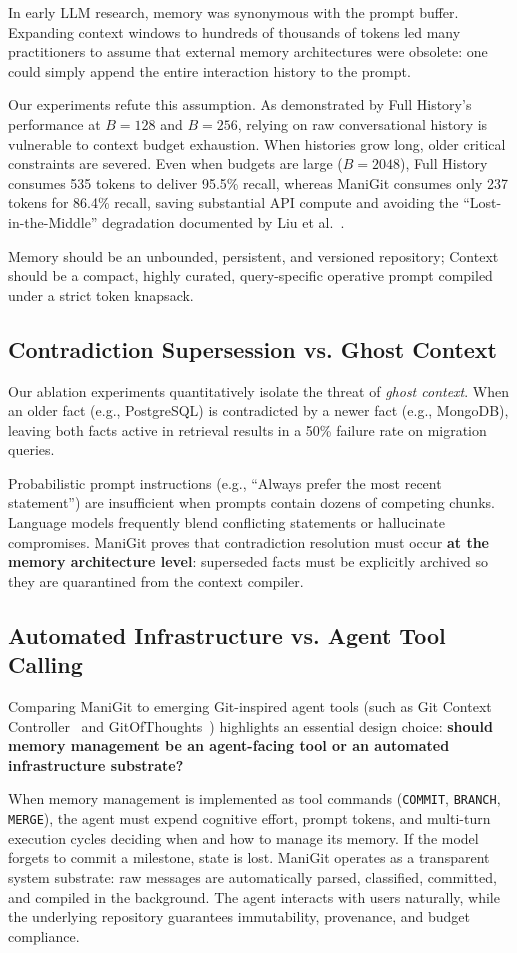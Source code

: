 In early LLM research, memory was synonymous with the prompt buffer. Expanding context windows to hundreds of thousands of tokens led many practitioners to assume that external memory architectures were obsolete: one could simply append the entire interaction history to the prompt.

Our experiments refute this assumption. As demonstrated by Full History's performance at $B=128$ and $B=256$, relying on raw conversational history is vulnerable to context budget exhaustion. When histories grow long, older critical constraints are severed. Even when budgets are large ($B=2048$), Full History consumes 535 tokens to deliver 95.5\% recall, whereas ManiGit consumes only 237 tokens for 86.4\% recall, saving substantial API compute and avoiding the ``Lost-in-the-Middle'' degradation documented by Liu et al.~\cite{liu2024lost}.

Memory should be an unbounded, persistent, and versioned repository; Context should be a compact, highly curated, query-specific operative prompt compiled under a strict token knapsack.

\subsection{Contradiction Supersession vs. Ghost Context}
Our ablation experiments quantitatively isolate the threat of \textit{ghost context}. When an older fact (e.g., PostgreSQL) is contradicted by a newer fact (e.g., MongoDB), leaving both facts active in retrieval results in a 50\% failure rate on migration queries.

Probabilistic prompt instructions (e.g., ``Always prefer the most recent statement'') are insufficient when prompts contain dozens of competing chunks. Language models frequently blend conflicting statements or hallucinate compromises. ManiGit proves that contradiction resolution must occur \textbf{at the memory architecture level}: superseded facts must be explicitly archived so they are quarantined from the context compiler.

\subsection{Automated Infrastructure vs. Agent Tool Calling}
Comparing ManiGit to emerging Git-inspired agent tools (such as Git Context Controller~\cite{wu2025gcc} and GitOfThoughts~\cite{shekar2025gitofthoughts}) highlights an essential design choice: \textbf{should memory management be an agent-facing tool or an automated infrastructure substrate?}

When memory management is implemented as tool commands (\texttt{COMMIT}, \texttt{BRANCH}, \texttt{MERGE}), the agent must expend cognitive effort, prompt tokens, and multi-turn execution cycles deciding when and how to manage its memory. If the model forgets to commit a milestone, state is lost. ManiGit operates as a transparent system substrate: raw messages are automatically parsed, classified, committed, and compiled in the background. The agent interacts with users naturally, while the underlying repository guarantees immutability, provenance, and budget compliance.
